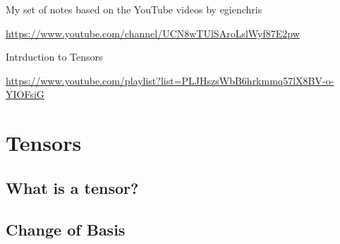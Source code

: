 \documentclass[a5paper,12pt]{book}
\begin{document}

\frontmatter
{}
My set of notes based on the YouTube videos by egienchris

\url{https://www.youtube.com/channel/UCN8wTUlSAroLslWyf87E2pw}\linebreak

Intrduction to Tensors

\url{https://www.youtube.com/playlist?list=PLJHszsWbB6hrkmmq57lX8BV-o-YIOFsiG}
\tableofcontents
\listoftables
\listoffigures
\clearpage
\mainmatter
\chapter{Tensors}
\section{What is a tensor?}

\clearpage
\section{Change of Basis}

\clearpage
{}
\printindex
\end{document}
